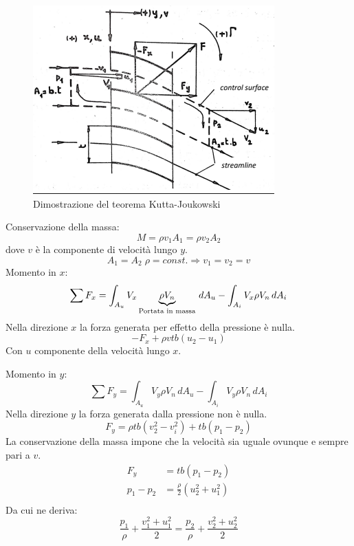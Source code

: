 \begin{figure}
\centering
\includegraphics[width = \textwidth]{gfx/KuttaJoukowskiDemo}
\caption{Dimostrazione del teorema Kutta-Joukowski}
\label{fig:KuttaJoukowskiDemo}
\end{figure}

Conservazione della massa:
\begin{equation}
M = \rho v_1 A_1 = \rho v_2 A_2
\end{equation}
dove $v$ è la componente di velocità lungo $y$.
\begin{equation}
A_1 = A_2 \; \rho = const. \Rightarrow v_1 = v_2 = v
\end{equation}
Momento in $x$:
\begin{equation}
\sum{F_x} = \int_{A_u}{V_x \underbrace{\rho V_n}_{\textup{Portata in massa}}\,dA_u} - \int_{A_i}{V_x \rho V_n \,dA_i}
\end{equation}
Nella direzione $x$ la forza generata per effetto della pressione è nulla.
\begin{equation}
- F_x + \rho v t b(u_2-u_1)
\end{equation}
Con $u$ componente della velocità lungo $x$.

Momento in $y$:
\begin{equation}
\sum{F_y} = \int_{A_u}{V_y \rho V_n\,dA_u} - \int_{A_i}{V_y \rho V_n\,dA_i}
\end{equation}
Nella direzione $y$ la forza generata dalla pressione non è nulla.
\begin{equation}
F_y = \rho t b (v_2^2 - v_i^2) + tb (p_1 - p_2)
\end{equation}
La conservazione della massa impone che la velocità sia uguale ovunque e sempre pari a $v$.
\begin{equation}
\begin{split}
F_y &= tb(p_1 - p_2)\\
p_1 - p_2 &= \frac{\rho}{2}(u_2^2+u_1^2)\\
\end{split}
\end{equation}
Da cui ne deriva:
\begin{equation}
\frac{p_1}{\rho} + \frac{v_1^2 + u_1^2}{2} = \frac{p_2}{\rho}+\frac{v_2^2 + u_2^2}{2}
\end{equation}

